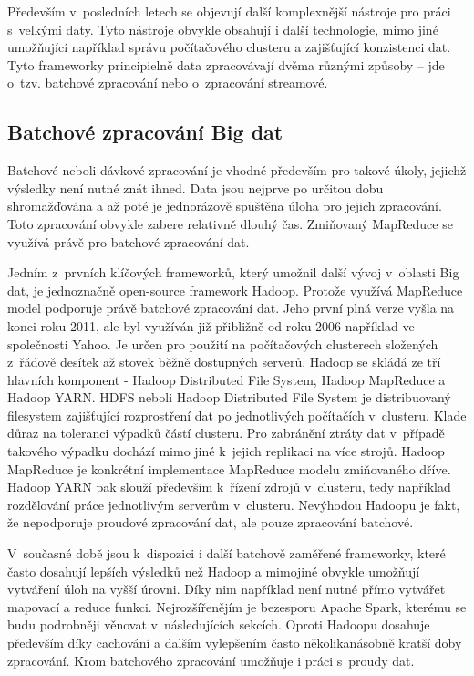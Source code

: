\documentclass[thesis=B,czech]{FITthesis}[2012/06/26]
\begin{document}
	Především v~posledních letech se objevují další komplexnější nástroje pro práci s~velkými daty. Tyto nástroje obvykle obsahují i další technologie, mimo jiné umožňující například správu počítačového clusteru a zajišťující konzistenci dat. Tyto frameworky principielně data zpracovávají dvěma různými způsoby -- jde o~tzv. batchové zpracování nebo o~zpracování streamové. 
	
\subsection{Batchové zpracování Big dat}
	Batchové neboli dávkové zpracování je vhodné především pro takové úkoly, jejichž výsledky není nutné znát ihned. Data jsou nejprve po určitou dobu shromažďována a až poté je jednorázově spuštěna úloha pro jejich zpracování. Toto zpracování obvykle zabere relativně dlouhý čas. Zmiňovaný MapReduce se využívá právě pro batchové zpracování dat. 

	Jedním z~prvních klíčových frameworků, který umožnil další vývoj v~oblasti Big dat, je jednoznačně open-source framework Hadoop\cite{hadoop-home}. Protože využívá MapReduce model podporuje právě batchové zpracování dat. Jeho první plná verze vyšla na konci roku 2011, ale byl využíván již přibližně od roku 2006 například ve společnosti Yahoo\cite{hadoop-history}. Je určen pro použití na počítačových clusterech složených z~řádově desítek až stovek běžně dostupných serverů. Hadoop se skládá ze tří hlavních komponent - Hadoop Distributed File System, Hadoop MapReduce a Hadoop YARN. HDFS neboli Hadoop Distributed File System je distribuovaný filesystem zajišťující rozprostření dat po jednotlivých počítačích v~clusteru. Klade důraz na toleranci výpadků částí clusteru. Pro zabránění ztráty dat v~případě takového výpadku dochází mimo jiné k~jejich replikaci na více strojů. Hadoop MapReduce je konkrétní implementace MapReduce modelu zmiňovaného dříve. Hadoop YARN pak slouží především k~řízení zdrojů v~clusteru, tedy například rozdělování práce jednotlivým serverům v~clusteru. Nevýhodou Hadoopu je fakt, že nepodporuje proudové zpracování dat, ale pouze zpracování batchové. 
	
	V~současné době jsou k~dispozici i další batchově zaměřené frameworky, které často dosahují lepších výsledků než Hadoop a mimojiné obvykle umožňují vytváření úloh na vyšší úrovni. Díky nim například není nutné přímo vytvářet mapovací a reduce funkci. Nejrozšířenějím je bezesporu Apache Spark\cite{spark-home}, kterému se budu podrobněji věnovat v~následujících sekcích. Oproti \mbox{Hadoopu} dosahuje především díky cachování a dalším vylepšením často několikanásobně kratší doby zpracování. Krom batchového zpracování umožňuje i práci s~proudy dat. 
\end{document}
